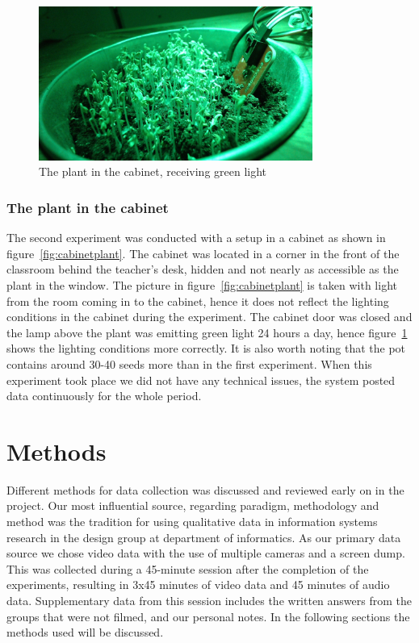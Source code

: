 \begin{figure}
\centering
\includegraphics[width=0.8\textwidth]{img/empiricalsetting/cupboardsystem.jpg}
\caption{The plant in the cabinet, receiving green light}
\label{fig:cabinetsystemplant}
\end{figure}

\subsubsection*{The plant in the cabinet}
The second experiment was conducted with a setup in a cabinet as shown in figure~\ref{fig:cabinetplant}. The cabinet was located in a corner in the front of the classroom behind the teacher's desk, hidden and not nearly as accessible as the plant in the window. The picture in figure~\ref{fig:cabinetplant} is taken with light from the room coming in to the cabinet, hence it does not reflect the lighting conditions in the cabinet during the experiment. The cabinet door was closed and the lamp above the plant was emitting green light 24 hours a day, hence figure~\ref{fig:cabinetsystemplant} shows the lighting conditions more correctly. It is also worth noting that the pot contains around 30-40 seeds more than in the first experiment. When this experiment took place we did not have any technical issues, the system posted data continuously for the whole period.


\section{Methods}
Different methods for data collection was discussed and reviewed early on in the project. Our most influential source, regarding paradigm, methodology and method was the tradition for using qualitative data in information systems research in the design group at department of informatics. As our primary data source we chose video data with the use of multiple cameras and a screen dump. This was collected during a 45-minute session after the completion of the experiments, resulting in 3x45 minutes of video data and 45 minutes of audio data. Supplementary data from this session includes the written answers from the groups that were not filmed, and our personal notes. In the following sections the methods used will be discussed. 

